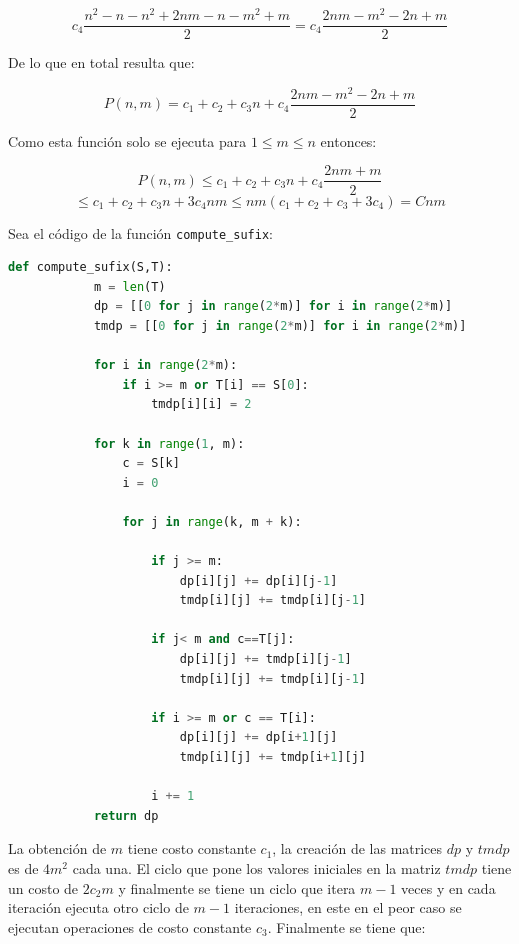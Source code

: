 \documentclass[a4paper]{article}
\begin{document}
    $$ c_4\frac{n^2 - n - n^2 + 2nm - n - m^2 + m}{2} = c_4 \frac{2nm - m^2 - 2n + m}{2}$$
            
    De lo que en total resulta que:

    $$P(n,m) = c_1 + c_2 + c_3n + c_4 \frac{2nm - m^2 - 2n + m}{2}$$

    Como esta funci\'on solo se ejecuta para $ 1 \leq m\leq n $ entonces:

    $$P(n,m) \leq c_1 + c_2 + c_3n + c_4 \frac{2nm + m}{2}$$
     $$ \leq c_1 + c_2 + c_3n + 3c_4nm \leq nm(c_1 + c_2 + c_3+ 3c_4) = Cnm$$

    Sea el c\'odigo de la funci\'on \texttt{compute\_sufix}: 

    \begin{lstlisting}[language=Python]
        def compute_sufix(S,T):
            m = len(T)
            dp = [[0 for j in range(2*m)] for i in range(2*m)]
            tmdp = [[0 for j in range(2*m)] for i in range(2*m)]
                    
            for i in range(2*m):
                if i >= m or T[i] == S[0]:
                    tmdp[i][i] = 2
                
            for k in range(1, m):    
                c = S[k]
                i = 0        
            
                for j in range(k, m + k):

                    if j >= m:
                        dp[i][j] += dp[i][j-1]
                        tmdp[i][j] += tmdp[i][j-1]          
                
                    if j< m and c==T[j]:
                        dp[i][j] += tmdp[i][j-1]
                        tmdp[i][j] += tmdp[i][j-1]
                
                    if i >= m or c == T[i]:
                        dp[i][j] += dp[i+1][j]
                        tmdp[i][j] += tmdp[i+1][j]

                    i += 1  
            return dp  
    \end{lstlisting}

    La obtenci\'on de $m$ tiene costo constante $c_1$, la creaci\'on de las matrices $dp$ y $tmdp$ es de $4m^2$ cada una.
    El ciclo que pone los valores iniciales en la matriz $tmdp$ tiene un costo de $2c_2m$ y finalmente se tiene  
    un ciclo que itera $m-1$ veces y en cada iteraci\'on ejecuta otro ciclo de $m-1$ iteraciones, en este en el peor caso se ejecutan 
    operaciones de costo constante $c_3$. Finalmente se tiene que: 
\end{document}
